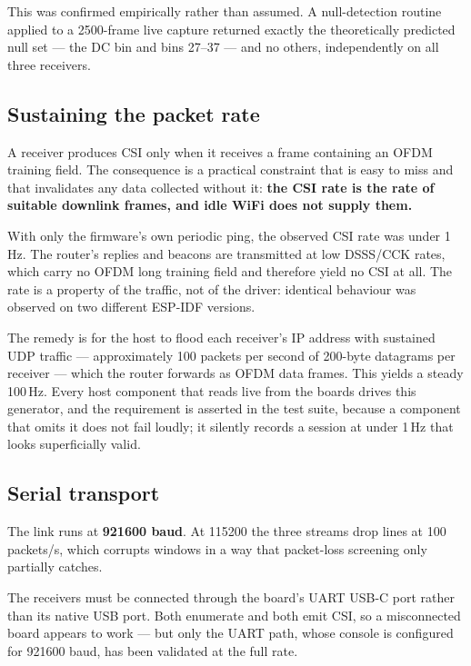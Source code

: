 This was confirmed empirically rather than assumed. A null-detection routine
applied to a 2500-frame live capture returned exactly the theoretically
predicted null set --- the DC bin and bins 27--37 --- and no others,
independently on all three receivers.

\subsection{Sustaining the packet rate}

A receiver produces CSI only when it receives a frame containing an OFDM
training field. The consequence is a practical constraint that is easy to
miss and that invalidates any data collected without it: \textbf{the CSI
rate is the rate of suitable downlink frames, and idle WiFi does not supply
them.}

With only the firmware's own periodic ping, the observed CSI rate was under
1\,Hz. The router's replies and beacons are transmitted at low DSSS/CCK
rates, which carry no OFDM long training field and therefore yield no CSI at
all. The rate is a property of the traffic, not of the driver: identical
behaviour was observed on two different ESP-IDF versions.

The remedy is for the host to flood each receiver's IP address with
sustained UDP traffic --- approximately 100 packets per second of 200-byte
datagrams per receiver --- which the router forwards as OFDM data frames.
This yields a steady 100\,Hz. Every host component that reads live from the
boards drives this generator, and the requirement is asserted in the test
suite, because a component that omits it does not fail loudly; it silently
records a session at under 1\,Hz that looks superficially valid.

\subsection{Serial transport}

The link runs at \textbf{921600 baud}. At 115200 the three streams drop
lines at 100\,packets/s, which corrupts windows in a way that packet-loss
screening only partially catches.

The receivers must be connected through the board's UART USB-C port rather
than its native USB port. Both enumerate and both emit CSI, so a
misconnected board appears to work --- but only the UART path, whose console
is configured for 921600 baud, has been validated at the full rate.

